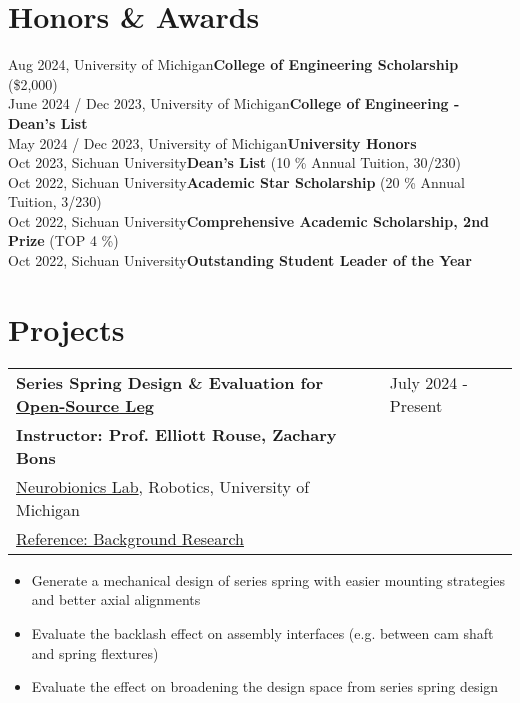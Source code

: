 \documentclass[letter,12pt]{article}
\begin{document}
\section{Honors \& Awards}

\small
{
    Aug 2024, University of Michigan\hfill \textbf{College of Engineering Scholarship} (\$2,000)\\
    June 2024 / Dec 2023, University of Michigan\hfill \textbf{College of Engineering - Dean's List}\\
    May 2024 / Dec 2023, University of Michigan\hfill \textbf{University Honors}\\
    Oct 2023, Sichuan University\hfill \textbf{Dean's List} (10 \% Annual Tuition, 30/230)\\
    Oct 2022, Sichuan University\hfill \textbf{Academic Star Scholarship} (20 \% Annual Tuition, 3/230)\\
    Oct 2022, Sichuan University\hfill \textbf{Comprehensive Academic Scholarship, 2nd Prize} (TOP 4 \%)\\
    Oct 2022, Sichuan University\hfill \textbf{Outstanding Student Leader of the Year}\\
}



\section{Projects}

\begin{tabularx}{\linewidth}{@{}l X@{}}
    \large \textbf{Series Spring Design \& Evaluation for \href{https://www.opensourceleg.org/about}{Open-Source Leg}} & \hfill July 2024 - Present \\
    \small{\textbf{Instructor: Prof. Elliott Rouse, Zachary Bons}} & \hfill {} \\
    \small{\href{https://neurobionics.robotics.umich.edu/}{Neurobionics Lab}, Robotics, University of Michigan} & \hfill {} \\
    \small{\href{https://doi.org/10.1109/TMECH.2023.3334957}{Reference: Background Research}} & \hfill {} \\
    \end{tabularx}
    

    \begin{itemize}[
        rightmargin=2cm
    ]
        \setlength{\itemsep}{1pt}
        \setlength{\parskip}{0pt}
        \setlength{\parsep}{0pt}
        \item {Generate a mechanical design of series spring with easier mounting strategies and better axial alignments}
        \item {Evaluate the backlash effect on assembly interfaces (e.g. between cam shaft and spring flextures)}
        \item {Evaluate the effect on broadening the design space from series spring design}
    \end{itemize}
\end{document}
